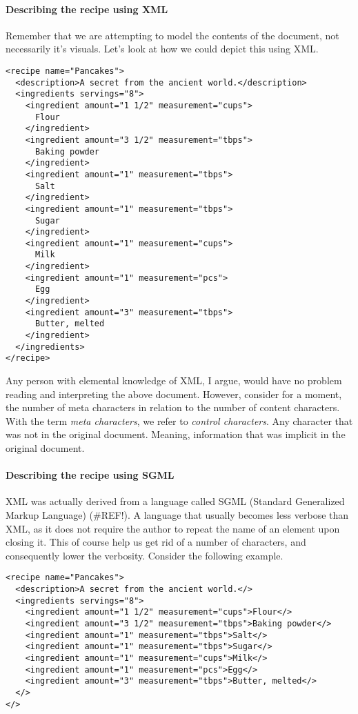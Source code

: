 \documentclass{scrreprt}
\begin{document}
\paragraph{Describing the recipe using XML}
Remember that we are attempting to model the contents of the document, not necessarily it's visuals. Let's look at how we could depict this using XML.
\begin{lstlisting}
<recipe name="Pancakes">
  <description>A secret from the ancient world.</description>
  <ingredients servings="8">
    <ingredient amount="1 1/2" measurement="cups">
      Flour
    </ingredient>
    <ingredient amount="3 1/2" measurement="tbps">
      Baking powder
    </ingredient>
    <ingredient amount="1" measurement="tbps">
      Salt
    </ingredient>
    <ingredient amount="1" measurement="tbps">
      Sugar
    </ingredient>
    <ingredient amount="1" measurement="cups">
      Milk
    </ingredient>
    <ingredient amount="1" measurement="pcs">
      Egg
    </ingredient>
    <ingredient amount="3" measurement="tbps">
      Butter, melted
    </ingredient>
  </ingredients>
</recipe>
\end{lstlisting}
Any person with elemental knowledge of XML, I argue, would have no problem reading and interpreting the above document. However, consider for a moment, the number of meta characters in relation to the number of content characters. With the term \emph{meta characters}, we refer to \emph{control characters}. Any character that was not in the original document. Meaning, information that was implicit in the original document.

\paragraph{Describing the recipe using SGML}
XML was actually derived from a language called SGML (Standard Generalized Markup Language) (\#REF!). A language that usually becomes less verbose than XML, as it does not require the author to repeat the name of an element upon closing it. This of course help us get rid of a number of characters, and consequently lower the verbosity. Consider the following example.

\begin{lstlisting}
<recipe name="Pancakes">
  <description>A secret from the ancient world.</>
  <ingredients servings="8">
    <ingredient amount="1 1/2" measurement="cups">Flour</>
    <ingredient amount="3 1/2" measurement="tbps">Baking powder</>
    <ingredient amount="1" measurement="tbps">Salt</>
    <ingredient amount="1" measurement="tbps">Sugar</>
    <ingredient amount="1" measurement="cups">Milk</>
    <ingredient amount="1" measurement="pcs">Egg</>
    <ingredient amount="3" measurement="tbps">Butter, melted</>
  </>
</>
\end{lstlisting}
\end{document}
